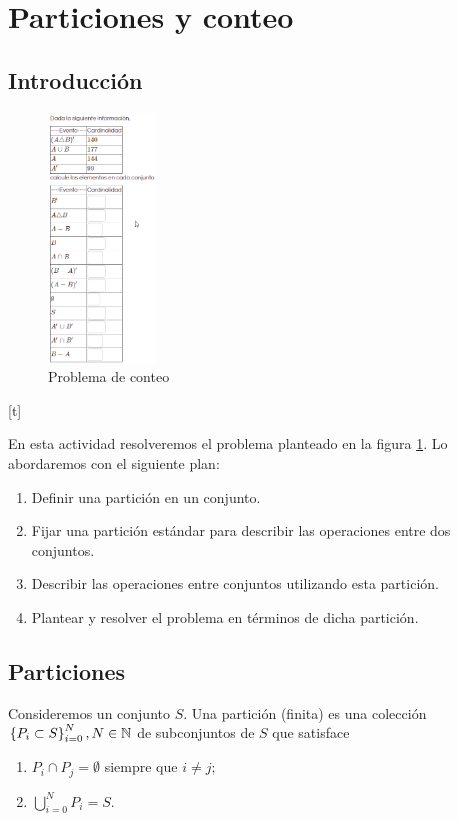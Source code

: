 \section{Particiones y conteo}

\subsection{Introducción}
\begin{figure}[t]
	\centering
	\includegraphics[height=250px]{./em/2020-08-15 19_49_02}
	\caption{Problema de conteo}
	\label{fig:problema-conteo}
\end{figure}[t]

En esta actividad resolveremos el problema planteado en la figura \ref{fig:problema-conteo}. Lo abordaremos con el siguiente plan:
\begin{enumerate}
	\item Definir una partición en un conjunto.
	\item Fijar una partición estándar para describir las operaciones entre dos conjuntos. 
	\item Describir las operaciones entre conjuntos utilizando esta partición.
	\item Plantear y resolver el problema en términos de dicha partición. 
\end{enumerate}


\subsection{Particiones}

Consideremos un conjunto $ S $. Una partición (finita) es una colección $ \left\{ P_i \subset S \right\}_{i=0}^{N}, N \in \mathbb{N} $ de subconjuntos de $ S $ que satisface
\begin{enumerate}
	\item $ P_i \cap P_j =\emptyset $ siempre que $ i\neq j $;
	\item $ \bigcup_{i=0}^{N} P_i = S $. 
\end{enumerate}

